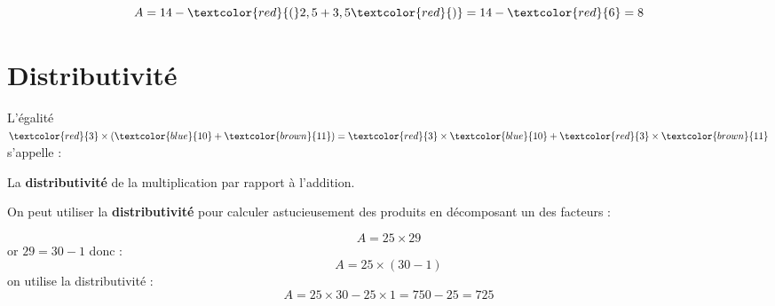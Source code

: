 \begin{pageCours}
\begin{Rq}
\[A=14-\textcolor{red}{(}2,5+3,5\textcolor{red}{)}=14-\textcolor{red}{6}=8\]
\end{Rq}

\section{Distributivité}

\begin{Def}
L'égalité $\textcolor{red}{3}\times(\textcolor{blue}{10}+\textcolor{brown}{11})=\textcolor{red}{3}\times\textcolor{blue}{10}+\textcolor{red}{3}\times\textcolor{brown}{11}$ s'appelle :

La \textbf{distributivité} de la multiplication par rapport à l'addition.
\end{Def}

\begin{Mt}
On peut utiliser la \textbf{distributivité} pour calculer astucieusement des produits en décomposant un des facteurs :
\begin{Ex}
\[A=25\times29\]
or $29=30-1$ donc :
\[A=25\times(30-1)\]
on utilise la distributivité :
\[A=25\times30-25\times1=750-25=725\]
\end{Ex}
\end{Mt}



% 

\end{pageCours} 
